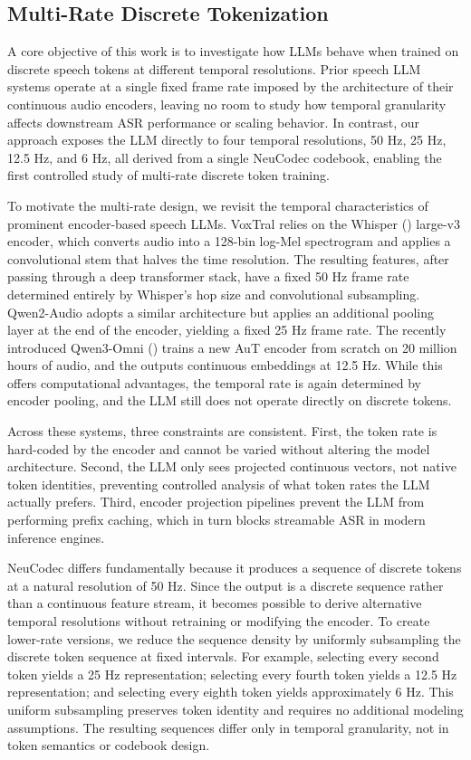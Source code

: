\documentclass{article}
\begin{document}
\subsection{Multi-Rate Discrete Tokenization}

A core objective of this work is to investigate how LLMs behave when trained on discrete speech tokens at different temporal resolutions. Prior speech LLM systems operate at a single fixed frame rate imposed by the architecture of their continuous audio encoders, leaving no room to study how temporal granularity affects downstream ASR performance or scaling behavior. In contrast, our approach exposes the LLM directly to four temporal resolutions, 50 Hz, 25 Hz, 12.5 Hz, and 6 Hz, all derived from a single NeuCodec codebook, enabling the first controlled study of multi-rate discrete token training.

To motivate the multi-rate design, we revisit the temporal characteristics of prominent encoder-based speech LLMs. VoxTral relies on the Whisper (\citet{radford2022robustspeechrecognitionlargescale}) large-v3 encoder, which converts audio into a 128-bin log-Mel spectrogram and applies a convolutional stem that halves the time resolution. The resulting features, after passing through a deep transformer stack, have a fixed 50 Hz frame rate determined entirely by Whisper's hop size and convolutional subsampling. Qwen2-Audio adopts a similar architecture but applies an additional pooling layer at the end of the encoder, yielding a fixed 25 Hz frame rate. The recently introduced Qwen3-Omni (\citet{xu2025qwen3omnitechnicalreport}) trains a new AuT encoder from scratch on 20 million hours of audio, and the outputs continuous embeddings at 12.5 Hz. While this offers computational advantages, the temporal rate is again determined by encoder pooling, and the LLM still does not operate directly on discrete tokens.

Across these systems, three constraints are consistent. First, the token rate is hard-coded by the encoder and cannot be varied without altering the model architecture. Second, the LLM only sees projected continuous vectors, not native token identities, preventing controlled analysis of what token rates the LLM actually prefers. Third, encoder projection pipelines prevent the LLM from performing prefix caching, which in turn blocks streamable ASR in modern inference engines.

NeuCodec differs fundamentally because it produces a sequence of discrete tokens at a natural resolution of 50 Hz. Since the output is a discrete sequence rather than a continuous feature stream, it becomes possible to derive alternative temporal resolutions without retraining or modifying the encoder. To create lower-rate versions, we reduce the sequence density by uniformly subsampling the discrete token sequence at fixed intervals. For example, selecting every second token yields a 25 Hz representation; selecting every fourth token yields a 12.5 Hz representation; and selecting every eighth token yields approximately 6 Hz. This uniform subsampling preserves token identity and requires no additional modeling assumptions. The resulting sequences differ only in temporal granularity, not in token semantics or codebook design.
\end{document}
